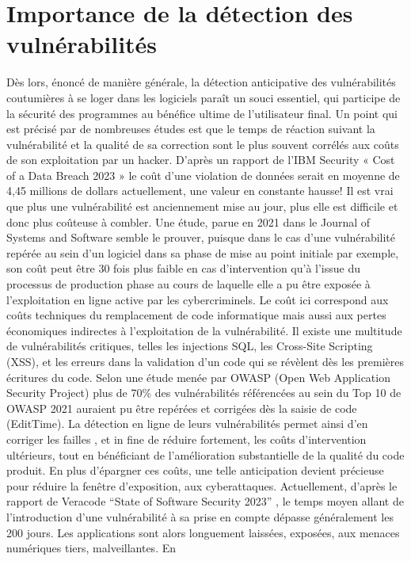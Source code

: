 \chapter{Importance de la détection des vulnérabilités}
Dès lors, énoncé de manière générale, la détection anticipative des vulnérabilités
coutumières à se loger dans les logiciels paraît un souci essentiel, qui participe de la
sécurité des programmes au bénéfice ultime de l’utilisateur final. Un point qui est précisé par
de nombreuses études est que le temps de réaction suivant la vulnérabilité et la qualité de
sa correction sont le plus souvent corrélés aux coûts de son exploitation par un hacker.
D’après un rapport de l’IBM Security « Cost of a Data Breach 2023 » le coût d’une violation
de données serait en moyenne de 4,45 millions de dollars actuellement, une valeur en
constante hausse! Il est vrai que plus une vulnérabilité est anciennement mise au jour, plus
elle est difficile et donc plus coûteuse à combler. Une étude, parue en 2021 dans le Journal
of Systems and Software semble le prouver, puisque dans le cas d’une vulnérabilité repérée
au sein d’un logiciel dans sa phase de mise au point initiale par exemple, son coût peut être
30 fois plus faible en cas d’intervention qu’à l’issue du processus de production phase au
cours de laquelle elle a pu être exposée à l’exploitation en ligne active par les
cybercriminels. Le coût ici correspond aux coûts techniques du remplacement de code
informatique mais aussi aux pertes économiques indirectes à l’exploitation de la
vulnérabilité.
Il existe une multitude de vulnérabilités critiques, telles les injections SQL, les Cross-Site
Scripting (XSS), et les erreurs dans la validation d’un code qui se révèlent dès les premières
écritures du code. Selon une étude menée par OWASP (Open Web Application Security
Project) plus de 70\% des vulnérabilités référencées au sein du Top 10 de OWASP 2021
auraient pu être repérées et corrigées dès la saisie de code (EditTime). La détection en ligne
de leurs vulnérabilités permet ainsi d’en corriger les failles , et in fine de réduire fortement,
les coûts d’intervention ultérieurs, tout en bénéficiant de l’amélioration substantielle de la
qualité du code produit.
En plus d’épargner ces coûts, une telle anticipation devient précieuse pour réduire la fenêtre
d’exposition, aux cyberattaques. Actuellement, d’après le rapport de Veracode “State of
Software Security 2023”
, le temps moyen allant de l’introduction d’une vulnérabilité à sa
prise en compte dépasse généralement les 200 jours. Les applications sont alors
longuement laissées, exposées, aux menaces numériques tiers, malveillantes. En
